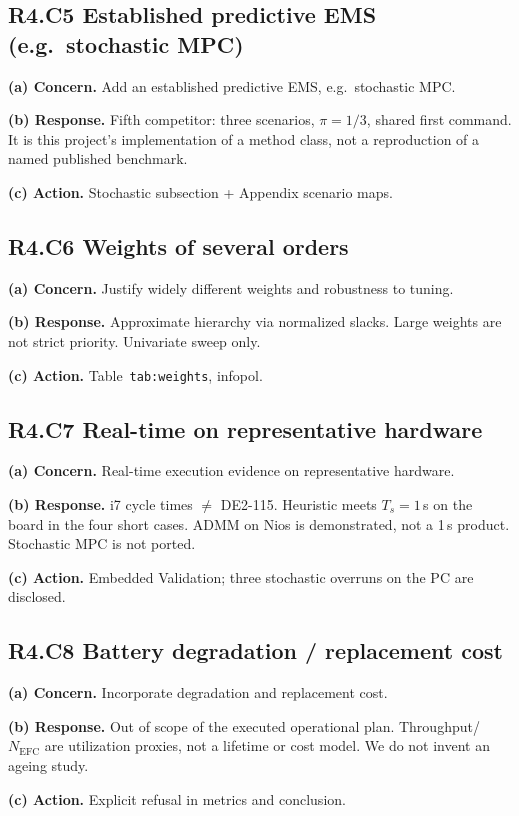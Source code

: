 \documentclass[11pt]{article}
\begin{document}
\subsection*{R4.C5 Established predictive EMS (e.g.\ stochastic MPC)}
\textbf{(a) Concern.} Add an established predictive EMS, e.g.\ stochastic MPC.

\textbf{(b) Response.} Fifth competitor: three scenarios, $\pi=1/3$, shared first command. It is this project's implementation of a method class, not a reproduction of a named published benchmark.

\textbf{(c) Action.} Stochastic subsection + Appendix scenario maps.

\subsection*{R4.C6 Weights of several orders}
\textbf{(a) Concern.} Justify widely different weights and robustness to tuning.

\textbf{(b) Response.} Approximate hierarchy via normalized slacks. Large weights are not strict priority. Univariate sweep only.

\textbf{(c) Action.} Table~\texttt{tab:weights}, infopol.

\subsection*{R4.C7 Real-time on representative hardware}
\textbf{(a) Concern.} Real-time execution evidence on representative hardware.

\textbf{(b) Response.} i7 cycle times $\neq$ DE2-115. Heuristic meets $T_s=1$\,s on the board in the four short cases. ADMM on Nios is demonstrated, not a 1\,s product. Stochastic MPC is not ported.

\textbf{(c) Action.} Embedded Validation; three stochastic overruns on the PC are disclosed.

\subsection*{R4.C8 Battery degradation / replacement cost}
\textbf{(a) Concern.} Incorporate degradation and replacement cost.

\textbf{(b) Response.} Out of scope of the executed operational plan. Throughput/$N_{\mathrm{EFC}}$ are utilization proxies, not a lifetime or cost model. We do not invent an ageing study.

\textbf{(c) Action.} Explicit refusal in metrics and conclusion.
\end{document}
